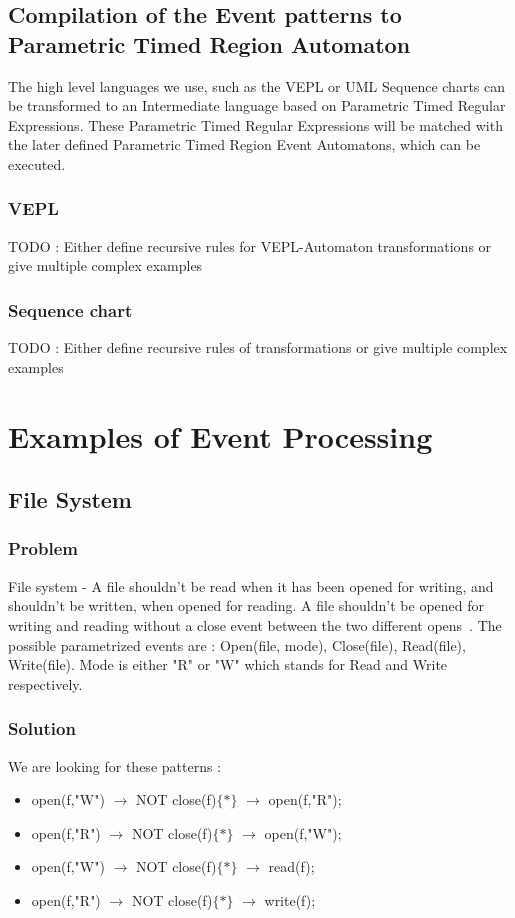 			
		\subsection{Compilation of the Event patterns to Parametric Timed Region Automaton}
				The high level languages we use, such as the VEPL or UML Sequence charts can be transformed to an Intermediate language based on Parametric Timed Regular Expressions.
				These Parametric Timed Regular Expressions will be matched with the later defined Parametric Timed Region Event Automatons, which can be executed.

			\subsubsection{VEPL}
				TODO : Either define recursive rules for VEPL-Automaton transformations or give multiple complex examples 
			\subsubsection{Sequence chart}
				TODO : Either define recursive rules of transformations  or give multiple complex examples
			
	\section{Examples of Event Processing}
 
 
		\subsection{File System}
			\subsubsection{Problem}
				File system - A file shouldn't be read when it has been opened for writing, and shouldn't be written, when opened for reading. 
				A file shouldn't be opened for writing and reading without a close event between the two different opens~\citep{marq}.
				The possible parametrized events are : 
				Open(file, mode), 
				Close(file), 
				Read(file), 
				Write(file). 
				Mode is either "R" or "W" which stands for Read and Write respectively.
			\subsubsection{Solution}
				We are looking for these patterns :

				\begin{itemize}
					\item open(f,"W") $\rightarrow$ NOT close(f)$\{\ast\}$ $\rightarrow$ open(f,"R");
					\item open(f,"R") $\rightarrow$ NOT close(f)$\{\ast\}$ $\rightarrow$ open(f,"W");
					\item open(f,"W") $\rightarrow$ NOT close(f)$\{\ast\}$ $\rightarrow$ read(f);
					\item open(f,"R") $\rightarrow$ NOT close(f)$\{\ast\}$ $\rightarrow$ write(f);
				\end{itemize}

